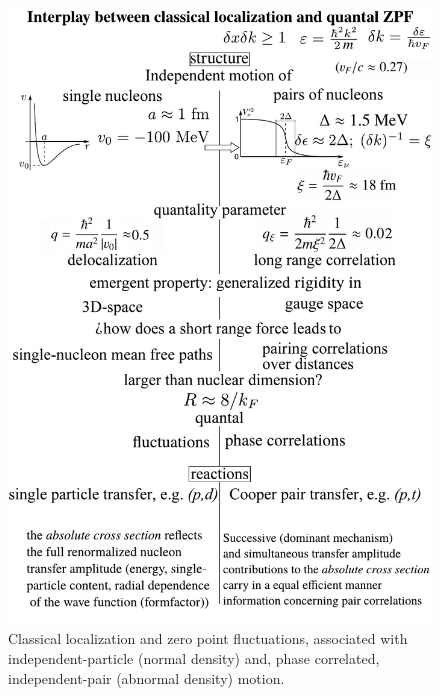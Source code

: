 \begin{figure}
\centerline{\includegraphics*[width=15cm,angle=0]{nutshell/figs/resumevec.pdf}}
\caption{Classical localization and zero point fluctuations, associated with independent-particle (normal density) and, phase correlated, independent-pair  (abnormal density) motion. 
}\label{fig1D2}
\end{figure}

